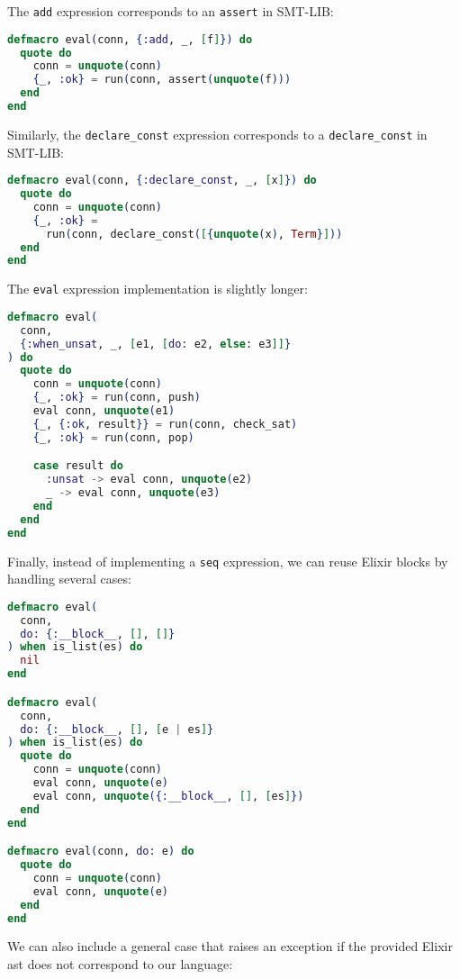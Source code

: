 The \verb|add| expression corresponds to an \verb|assert| in 
SMT-LIB:

\begin{lstlisting}[language=elixir,numbers=none,frame=none]
defmacro eval(conn, {:add, _, [f]}) do
  quote do
    conn = unquote(conn)
    {_, :ok} = run(conn, assert(unquote(f)))
  end
end
\end{lstlisting}

Similarly, the \verb|declare_const| expression corresponds to a \verb|declare_const| in 
SMT-LIB:

\begin{lstlisting}[language=elixir,numbers=none,frame=none]
defmacro eval(conn, {:declare_const, _, [x]}) do
  quote do
    conn = unquote(conn)
    {_, :ok} = 
      run(conn, declare_const([{unquote(x), Term}]))
  end
end
\end{lstlisting}

The \verb|eval| expression implementation is slightly longer:

\begin{lstlisting}[language=elixir,numbers=none,frame=none]
defmacro eval(
  conn, 
  {:when_unsat, _, [e1, [do: e2, else: e3]]}
) do
  quote do
    conn = unquote(conn)
    {_, :ok} = run(conn, push)
    eval conn, unquote(e1)
    {_, {:ok, result}} = run(conn, check_sat)
    {_, :ok} = run(conn, pop)

    case result do
      :unsat -> eval conn, unquote(e2)
      _ -> eval conn, unquote(e3)
    end
  end
end
\end{lstlisting}

Finally, instead of implementing a \verb|seq| expression, we can reuse 
Elixir blocks by handling several cases:

\begin{lstlisting}[language=elixir,numbers=none,frame=none]
defmacro eval(
  conn, 
  do: {:__block__, [], []}
) when is_list(es) do
  nil
end

defmacro eval(
  conn, 
  do: {:__block__, [], [e | es]}
) when is_list(es) do
  quote do
    conn = unquote(conn)
    eval conn, unquote(e)
    eval conn, unquote({:__block__, [], [es]})
  end
end

defmacro eval(conn, do: e) do
  quote do
    conn = unquote(conn)
    eval conn, unquote(e)
  end
end
\end{lstlisting}

We can also include a general case that raises an exception if 
the provided Elixir \gls{ast} does not correspond to our language:

